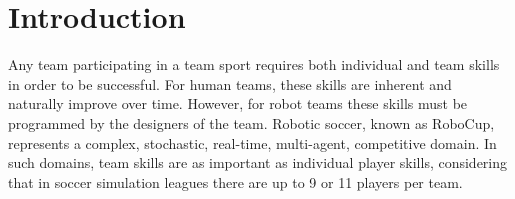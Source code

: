 \chapter{Introduction}
\label{intro}


Any team participating in a team sport requires both individual and team skills in order to be successful. For human teams, these skills are inherent and naturally improve over time. However, for robot teams these skills must be programmed by the designers of the team. Robotic soccer, known as RoboCup, represents a complex, stochastic, real-time, multi-agent, competitive domain. In such domains, team skills are as important as individual player skills, considering that in soccer simulation leagues there are up to 9 or 11 players per team.
 
